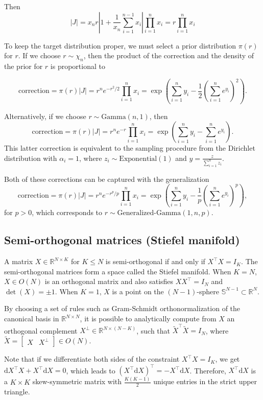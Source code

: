 \documentclass[11pt]{article}
\newcommand{\dv}[1]{\mathrm{d}{#1}}
\begin{document}
Then
\[
  |J| = x_n r \left|1 + \frac{1}{x_n}\sum_{i=1}^{n-1} x_i\right|
  \prod_{i=1}^n x_i = r \prod_{i=1}^n x_i
\]

To keep the target distribution proper, we must select a prior
distribution $\pi(r)$ for $r$.  If we choose $r \sim \chi_n$, then the
product of the correction and the density of the prior for $r$ is
proportional to

\[
  \mathrm{correction}
  = \pi(r) |J| = r^n e^{-r^2/2} \prod_{i=1}^n x_i
  = \exp\left(\sum_{i=1}^n y_i - \frac{1}{2}\left(\sum_{i=1}^n
      e^{y_i}\right)^2\right).
\]

Alternatively, if we choose $r \sim \mathrm{Gamma}(n, 1)$, then
\[
  \mathrm{correction} = \pi(r) |J| = r^n e^{-r} \prod_{i=1}^n x_i =
  \exp\left(\sum_{i=1}^n y_i - \sum_{i=1}^n e^{y_i}\right).
\]
This latter correction is equivalent to the sampling procedure from
the Dirichlet distribution with $\alpha_i=1$, where
$z_i \sim \mathrm{Exponential}(1)$ and
$y = \frac{z}{\sum_{i=1}^n z_i}$.

Both of these corrections can be captured with the generalization
\[
  \mathrm{correction}
  = \pi(r) |J|
  = r^n e^{-r^p/p} \prod_{i=1}^n x_i
  = \exp\left(\sum_{i=1}^n y_i - \frac{1}{p} \left(\sum_{i=1}^n e^{y_i}\right)^p\right),
\]
for $p > 0$, which corresponds to $r \sim \text{Generalized-Gamma}(1, n, p)$.

\subsection{Semi-orthogonal matrices (Stiefel manifold)}

A matrix $X \in \mathbb{R}^{N \times K}$ for $K \le N$ is semi-orthogonal if and only if $X^\top X = I_K$.
The semi-orthogonal matrices form a space called the Stiefel manifold.
When $K=N$, $X \in O(N)$ is an orthogonal matrix and also satisfies $X X^\top = I_N$ and $\det(X) = \pm 1$.
When $K=1$, $X$ is a point on the $(N-1)$-sphere $\mathbb{S}^{N-1} \subset \mathbb{R}^N$.

By choosing a set of rules such as Gram-Schmidt orthonormalization of the canonical basis in $\mathbb{R}^{N \times N}$, it is possible to analytically compute from $X$ an orthogonal complement $X^\perp \in \mathbb{R}^{N \times (N - K)}$, such that $\tilde{X}^\top \tilde{X} = I_N$, where $\tilde{X} = \begin{bmatrix}X & X^\perp \end{bmatrix} \in O(N)$.

Note that if we differentiate both sides of the constraint $X^\top X = I_K$, we get $\dv{X}^\top X + X^\top \dv{X} = 0$, which leads to $(X^\top \dv{X})^\top = - X^\top \dv{X}$.
Therefore, $X^\top \dv{X}$ is a $K \times K$ skew-symmetric matrix with $\frac{K(K-1)}{2}$ unique entries in the strict upper triangle.
\end{document}
